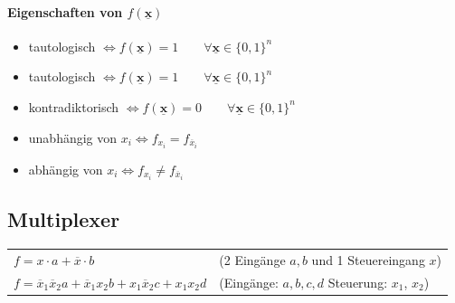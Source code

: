 \documentclass[6pt,a4paper]{scrartcl}
\renewcommand{\vec}[1]{\ensuremath{\underline{\boldsymbol {#1}}}}
\newcommand{\ol}[1]{\ensuremath{\overline{#1}}}									%
\renewcommand{\vec}[1]{\ensuremath{\underline{\boldsymbol {#1}}}}
\begin{document}
\begin{multicols*}{3}
	\paragraph{Eigenschaften von $f(\vec{x})$}
	\begin{itemize}\itemsep0pt
		\item tautologisch $\Leftrightarrow f(\vec{x})=1 \qquad \forall \vec x \in \{0,1\}^n$
		\item tautologisch $\Leftrightarrow f(\vec{x})=1 \qquad \forall \vec x \in \{0,1\}^n$
		\item kontradiktorisch $\Leftrightarrow f(\vec{x})=0 \qquad \forall \vec x \in \{0,1\}^n$
				\item unabhängig von $x_i \Leftrightarrow f_{x_i} = f_{\overline x_i}$
						\item abhängig von $x_i \Leftrightarrow f_{x_i} \ne f_{\overline x_i}$
			\end{itemize}
	
	\subsection{Multiplexer}
	\begin{tabular}{ll}
		$f = x \cdot a + \overline x \cdot b$ & (2 Eingänge $a,b$ und 1 Steuereingang $x$)\\
		$f = \ol x_1 \ol x_2 a + \ol x_1 x_2 b + x_1  \ol x_2 c + x_1 x_2d$ & (Eingänge: $a,b,c,d$  Steuerung: $x_1$, $x_2$)\\
	\end{tabular}




\end{multicols*}
\end{document}
